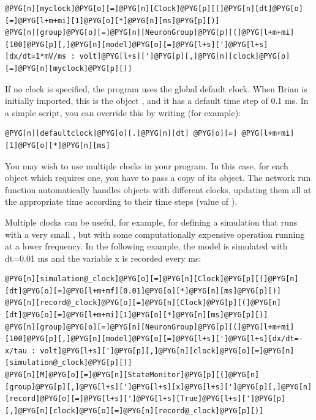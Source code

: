 \documentclass[letterpaper,10pt,english]{manual}
\begin{document}
\begin{Verbatim}[commandchars=@\[\]]
@PYG[n][myclock]@PYG[o][=]@PYG[n][Clock]@PYG[p][(]@PYG[n][dt]@PYG[o][=]@PYG[l+m+mi][1]@PYG[o][*]@PYG[n][ms]@PYG[p][)]
@PYG[n][group]@PYG[o][=]@PYG[n][NeuronGroup]@PYG[p][(]@PYG[l+m+mi][100]@PYG[p][,]@PYG[n][model]@PYG[o][=]@PYG[l+s][']@PYG[l+s][dx/dt=1*mV/ms : volt]@PYG[l+s][']@PYG[p][,]@PYG[n][clock]@PYG[o][=]@PYG[n][myclock]@PYG[p][)]
\end{Verbatim}

If no clock is specified, the program uses the global default clock. When Brian is initially
imported, this is the object \hyperlink{brian.defaultclock}{}, and it has a default
time step of 0.1 ms. In a simple script, you can override this by writing (for example):

\begin{Verbatim}[commandchars=@\[\]]
@PYG[n][defaultclock]@PYG[o][.]@PYG[n][dt] @PYG[o][=] @PYG[l+m+mi][1]@PYG[o][*]@PYG[n][ms]
\end{Verbatim}

You may wish to use multiple clocks in your program. In this case,
for each object which requires one, you have to pass a copy of its
\hyperlink{brian.Clock}{} object. The network run function automatically handles objects
with different clocks, updating them all at the appropriate time
according to their time steps (value of \hyperlink{brian.Clock.dt}{}).

Multiple clocks can be useful, for example, for defining a simulation
that runs with a very small , but with some computationally
expensive operation running at a lower frequency. In the following example, the model
is simulated with dt=0.01 ms and the variable x is recorded every ms:

\begin{Verbatim}[commandchars=@\[\]]
@PYG[n][simulation@_clock]@PYG[o][=]@PYG[n][Clock]@PYG[p][(]@PYG[n][dt]@PYG[o][=]@PYG[l+m+mf][0.01]@PYG[o][*]@PYG[n][ms]@PYG[p][)]
@PYG[n][record@_clock]@PYG[o][=]@PYG[n][Clock]@PYG[p][(]@PYG[n][dt]@PYG[o][=]@PYG[l+m+mi][1]@PYG[o][*]@PYG[n][ms]@PYG[p][)]
@PYG[n][group]@PYG[o][=]@PYG[n][NeuronGroup]@PYG[p][(]@PYG[l+m+mi][100]@PYG[p][,]@PYG[n][model]@PYG[o][=]@PYG[l+s][']@PYG[l+s][dx/dt=-x/tau : volt]@PYG[l+s][']@PYG[p][,]@PYG[n][clock]@PYG[o][=]@PYG[n][simulation@_clock]@PYG[p][)]
@PYG[n][M]@PYG[o][=]@PYG[n][StateMonitor]@PYG[p][(]@PYG[n][group]@PYG[p][,]@PYG[l+s][']@PYG[l+s][x]@PYG[l+s][']@PYG[p][,]@PYG[n][record]@PYG[o][=]@PYG[l+s][']@PYG[l+s][True]@PYG[l+s][']@PYG[p][,]@PYG[n][clock]@PYG[o][=]@PYG[n][record@_clock]@PYG[p][)]
\end{Verbatim}
\end{document}
